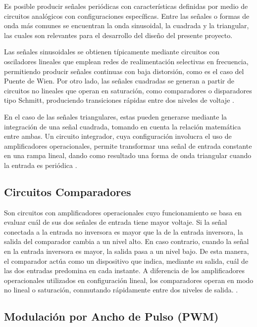\documentclass[journal, onecolumn]{IEEEtran}
\begin{document}
Es posible producir señales periódicas con características definidas por medio de circuitos analógicos con configuraciones específicas. Entre las señales o formas de onda más comunes se encuentran la onda sinusoidal, la cuadrada y la triangular, las cuales son relevantes para el desarrollo del diseño del presente proyecto. 

Las señales sinusoidales se obtienen típicamente mediante circuitos con osciladores lineales que emplean redes de realimentación selectivas en frecuencia, permitiendo producir señales continuas con baja distorsión, como es el caso del Puente de Wien. Por otro lado, las señales cuadradas se generan a partir de circuitos no lineales que operan en saturación, como comparadores o disparadores tipo Schmitt, produciendo transiciones rápidas entre dos niveles de voltaje \cite{Horowitz1989} .

En el caso de las señales triangulares, estas pueden generarse mediante la integración de una señal cuadrada, tomando en cuenta la relación matemática entre ambas. Un circuito integrador, cuya configuración involucra el uso de amplificadores operacionales, permite transformar una señal de entrada constante en una rampa lineal, dando como resultado una forma de onda triangular cuando la entrada es periódica \cite{Horowitz1989} .

\subsection{Circuitos Comparadores} 

Son circuitos con amplificadores operacionales cuyo funcionamiento se basa en evaluar cuál de sus dos señales de entrada tiene mayor voltaje. Si la señal conectada a la entrada no inversora es mayor que la de la entrada inversora, la salida del comparador cambia a un nivel alto. En caso contrario, cuando la señal en la entrada inversora es mayor, la salida pasa a un nivel bajo. De esta manera, el comparador actúa como un dispositivo que indica, mediante su salida, cuál de las dos entradas predomina en cada instante. A diferencia de los amplificadores operacionales utilizados en configuración lineal, los comparadores operan en modo no lineal o saturación, conmutando rápidamente entre dos niveles de salida. \cite{Mancini2002} . 

\subsection{Modulación por Ancho de Pulso (PWM)}
\end{document}

